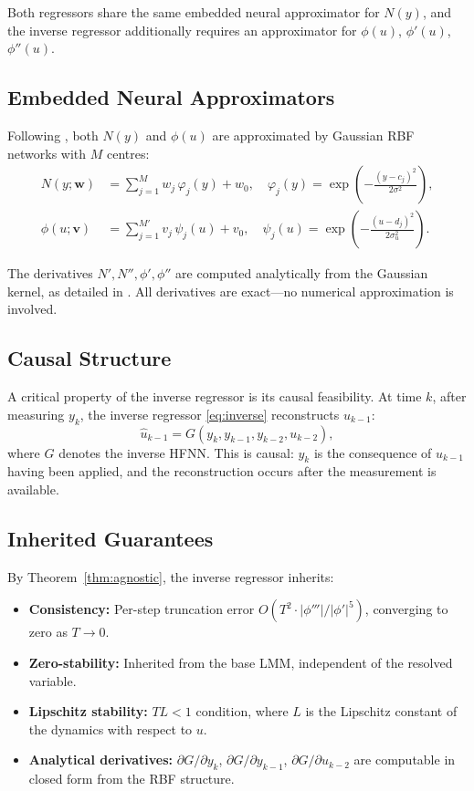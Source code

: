 \documentclass[lettersize,journal]{IEEEtran}
\begin{document}
Both regressors share the same embedded neural approximator for $N(y)$, and the inverse regressor additionally requires an approximator for $\phi(u)$, $\phi'(u)$, $\phi''(u)$.

\subsection{Embedded Neural Approximators}

Following \cite{rodrigo2025hfnn}, both $N(y)$ and $\phi(u)$ are approximated by Gaussian RBF networks with $M$ centres:
\begin{align}
N(y; \mathbf{w}) &= \sum_{j=1}^{M} w_j \, \varphi_j(y) + w_0, \quad \varphi_j(y) = \exp\!\left(-\frac{(y - c_j)^2}{2\sigma^2}\right), \label{eq:rbf_N} \\
\phi(u; \mathbf{v}) &= \sum_{j=1}^{M'} v_j \, \psi_j(u) + v_0, \quad \psi_j(u) = \exp\!\left(-\frac{(u - d_j)^2}{2\sigma_u^2}\right). \label{eq:rbf_phi}
\end{align}

The derivatives $N', N'', \phi', \phi''$ are computed analytically from the Gaussian kernel, as detailed in \cite{rodrigo2025hfnn}. All derivatives are exact---no numerical approximation is involved.

\subsection{Causal Structure}

A critical property of the inverse regressor is its causal feasibility. At time $k$, after measuring $y_k$, the inverse regressor \eqref{eq:inverse} reconstructs $u_{k-1}$:
\begin{equation}
\label{eq:causal}
\hat{u}_{k-1} = G(y_k, y_{k-1}, y_{k-2}, u_{k-2}),
\end{equation}
where $G$ denotes the inverse HFNN. This is causal: $y_k$ is the consequence of $u_{k-1}$ having been applied, and the reconstruction occurs after the measurement is available.

\subsection{Inherited Guarantees}

By Theorem~\ref{thm:agnostic}, the inverse regressor inherits:
\begin{itemize}
    \item \textbf{Consistency:} Per-step truncation error $O(T^2 \cdot |\phi'''| / |\phi'|^5)$, converging to zero as $T \to 0$.
    \item \textbf{Zero-stability:} Inherited from the base LMM, independent of the resolved variable.
    \item \textbf{Lipschitz stability:} $TL < 1$ condition, where $L$ is the Lipschitz constant of the dynamics with respect to $u$.
    \item \textbf{Analytical derivatives:} $\partial G / \partial y_k$, $\partial G / \partial y_{k-1}$, $\partial G / \partial u_{k-2}$ are computable in closed form from the RBF structure.
\end{itemize}
\end{document}
